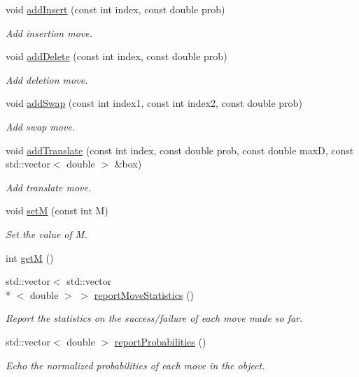 \begin{DoxyCompactItemize}
void \hyperlink{classmoves_ab4583b3075f51cce55c3aeb84a58430d}{add\-Insert} (const int index, const double prob)
\begin{DoxyCompactList}\small\item\em Add insertion move. \end{DoxyCompactList}\item 
void \hyperlink{classmoves_ac4307636570c4d4bc07c4cba3887005e}{add\-Delete} (const int index, const double prob)
\begin{DoxyCompactList}\small\item\em Add deletion move. \end{DoxyCompactList}\item 
void \hyperlink{classmoves_a03cebfa2d8d1cecf253df573fdecc5d0}{add\-Swap} (const int index1, const int index2, const double prob)
\begin{DoxyCompactList}\small\item\em Add swap move. \end{DoxyCompactList}\item 
void \hyperlink{classmoves_a91bb7969368fdbb66920a11d79fe7552}{add\-Translate} (const int index, const double prob, const double max\-D, const std\-::vector$<$ double $>$ \&box)
\begin{DoxyCompactList}\small\item\em Add translate move. \end{DoxyCompactList}\item 
void \hyperlink{classmoves_ab603c6ce829075e3232ff41a7d5e2aab}{set\-M} (const int M)
\begin{DoxyCompactList}\small\item\em Set the value of M. \end{DoxyCompactList}\item 
int \hyperlink{classmoves_a57e814fe08153419f92a983cbf33796d}{get\-M} ()
\item 
std\-::vector$<$ std\-::vector\\*
$<$ double $>$ $>$ \hyperlink{classmoves_ad3e937628d85cdbbe02732648cb533e2}{report\-Move\-Statistics} ()
\begin{DoxyCompactList}\small\item\em Report the statistics on the success/failure of each move made so far. \end{DoxyCompactList}\item 
std\-::vector$<$ double $>$ \hyperlink{classmoves_a84f8198bd43c0f6b8b52dce3abdfa6a4}{report\-Probabilities} ()
\begin{DoxyCompactList}\small\item\em Echo the normalized probabilities of each move in the object. \end{DoxyCompactList}\end{DoxyCompactItemize}


